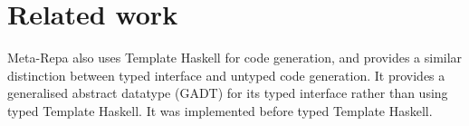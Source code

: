 \section{Related work}
Meta-Repa \cite{ankner2013edsl} also uses Template Haskell for code generation, and provides a similar distinction between typed interface and untyped code generation.
It provides a generalised abstract datatype (GADT) for its typed interface rather than using typed Template Haskell.
It was implemented before typed Template Haskell.


